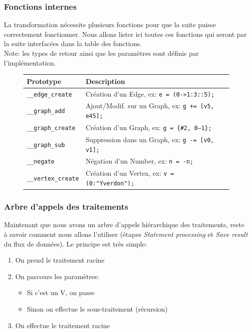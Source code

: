 \documentclass[french]{article}
\begin{document}
			\subsubsection{Fonctions internes}
				La transformation nécessite plusieurs fonctions pour que la suite puisse correctement fonctionner. Nous allons lister ici toutes ces fonctions qui seront par la suite interfacées dans la table des fonctions.\\
				
				Note: les types de retour ainsi que les paramètres sont définis par l'implémentation.
				
				\begin{figure}[H]
					\centering
					\begin{tabular}{lll}
						Prototype & Description\\
						\hline
						\texttt{\_\_edge\_create} & Création d'un Edge, ex: \texttt{e = (0->1:3::5);}\\
						\texttt{\_\_graph\_add} & Ajout/Modif. sur un Graph, ex: \texttt{g += [v5, e45];}\\
						\texttt{\_\_graph\_create} & Création d'un Graph, ex: \texttt{g = \{\#2, 0--1\};}\\
						\texttt{\_\_graph\_sub} & Suppression dans un Graph, ex: \texttt{g -= [v0, v1];}\\
						\texttt{\_\_negate} & Négation d'un Number, ex: \texttt{n = -n;}\\
						\texttt{\_\_vertex\_create} & Création d'un Vertex, ex: \texttt{v = (0:"Yverdon");}\\
					\end{tabular}
				\end{figure}
			
			\subsubsection{Arbre d'appels des traitements}
				\label{subsubsec:arbre-d-appels-des-traitements}
				Maintenant que nous avons un arbre d'appels hiérarchique des traitements, reste à savoir comment nous allons l'utiliser (étapes \textit{Statement processing} et \textit{Save result} du flux de données). Le principe est très simple: 
				
				\begin{enumerate}
					\item On prend le traitement racine
					\item On parcours les paramètres:
					\begin{itemize}
						\item Si c'est un V, on passe
						\item Sinon on effectue le sous-traitement (récursion)
					\end{itemize}
					\item On effectue le traitement racine
				\end{enumerate}
				
\end{document}
